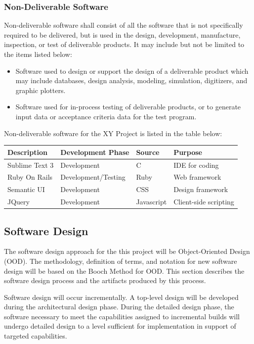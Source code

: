 \documentclass[a4paper, 11pt]{article}
\begin{document}
\subsubsection{Non-Deliverable Software}
Non-deliverable software shall consist of all the software that is not specifically required to be delivered, but is used in the design, development, manufacture, inspection, or test of deliverable products. It may include but not be limited to the items listed below:
\begin{itemize}
	\item Software used to design or support the design of a deliverable product which may include databases, design analysis, modeling, simulation, digitizers, and graphic plotters.
	\item Software used for in-process testing of deliverable products, or to generate input data or acceptance criteria data for the test program.
\end{itemize}
Non-deliverable software for the XY Project is listed in the table below:
\begin{table}[H]
	\begin{tabular}{l l l l}
		\textbf{Description} & \textbf{Development Phase} & \textbf{Source} & \textbf{Purpose}\\ \hline
		Sublime Text 3 & Development & C & IDE for coding \\
		Ruby On Rails & Development/Testing & Ruby & Web framework \\
		Semantic UI & Development & CSS & Design framework \\
		JQuery & Development & Javascript & Client-side scripting \\
	\end{tabular}
\end{table}

\subsection{Software Design}
The software design approach for the this project will be Object-Oriented Design (OOD). The methodology, definition of terms, and notation for new software design will be based on the Booch Method for OOD. This section describes the software design process and the artifacts produced by this process.

Software design will occur incrementally. A top-level design will be developed during the architectural design phase. During the detailed design phase, the software necessary to meet the capabilities assigned to incremental builds will undergo detailed design to a level sufficient for implementation in support of targeted capabilities.
\end{document}
